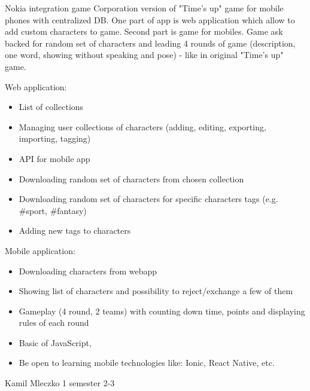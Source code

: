 \begin{project}
{Nokia integration game}
{Corporation version of "Time's up" game for mobile phones with centralized DB. One part of app is web application which allow to add custom characters to game. Second part is game for mobiles. Game ask backed for random set of characters and leading 4 rounds of game (description, one word, showing without speaking and pose) - like in original "Time's up" game.} 
{
Web application:
\begin{itemize}
	\item List of collections
	\item Managing user collections of characters (adding, editing, exporting, importing, tagging)
	\item API for mobile app
	\item Downloading random set of characters from chosen collection
	\item Downloading random set of characters for specific characters tags (e.g. \#sport, \#fantasy)
	\item Adding new tags to characters
\end{itemize}
\bigbreak
Mobile application:
\begin{itemize}
	\item Downloading characters from webapp
	\item Showing list of characters and possibility to reject/exchange a few of them
	\item Gameplay (4 round, 2 teams) with counting down time, points and displaying rules of each round
\end{itemize}
}
{
\begin{itemize}
	\item Basic of JavaScript,
	\item Be open to learning mobile technologies like: Ionic, React Native, etc.
\end{itemize}
}
{Kamil Mleczko}
{1 semester}
{2-3}
\end{project}
